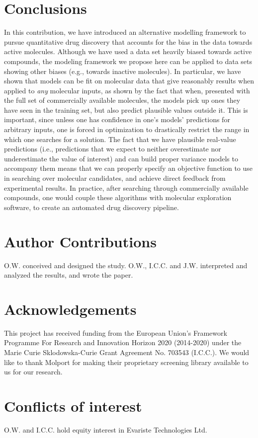 \documentclass[journal=jacsat,manuscript=article]{achemso}
\begin{document}
\section*{Conclusions}
In this contribution, 
we have introduced an alternative modelling framework to pursue quantitative drug discovery that accounts for the bias in the data towards active molecules. Although we have used a data set heavily biased towards active compounds, the modeling framework we propose here can be applied to data sets showing other biases (e.g., towards inactive molecules).
In particular, we have shown that models can be fit on molecular data that give reasonably results when applied to \textit{any} molecular inputs, as shown by the fact that when, presented with the full set of commercially available molecules, the models pick up ones they have seen in the training set, but also predict plausible values outside it.  This is important, since unless one has confidence in one's models' predictions for arbitrary inputs, one is forced in optimization to drastically restrict the range in which one searches for a solution.   The fact that we have plausible real-value predictions (i.e., predictions that we expect to neither overestimate nor underestimate the value of interest) and can build proper variance models to accompany them means that we can properly specify an objective function to use in searching over molecular candidates, and achieve direct feedback from experimental results.  In practice, after searching through commercially available compounds, one would couple these algorithms with molecular exploration software\cite{Firth2015,Merk2018}, 
to create an automated drug discovery pipeline.  


\newpage
\section*{Author Contributions}
O.W. conceived and designed the study. 
O.W., I.C.C. and J.W. interpreted and analyzed the results, and wrote the paper.

\section*{Acknowledgements}
This project has received funding from the European Union’s Framework Programme For Research and Innovation Horizon 2020 (2014-2020) under the Marie Curie Sklodowska-Curie Grant Agreement No. 703543 (I.C.C.).
We would like to thank Molport for making their proprietary screening library available to us for our research.

\section*{Conflicts of interest}
O.W. and I.C.C. hold equity interest in Evariste Technologies Ltd.

\newpage

%

\end{document}

